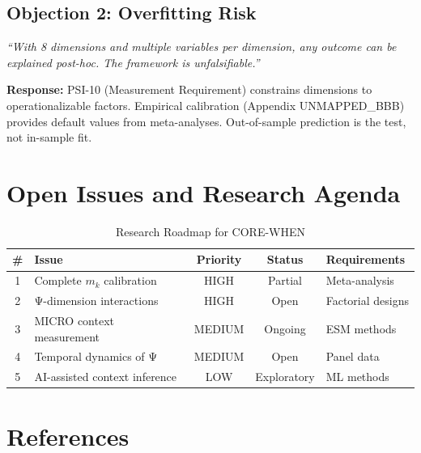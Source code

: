 \subsection{Objection 2: Overfitting Risk}

\begin{tcolorbox}[colback=red!5!white, colframe=red!50!black,
    title=Objection: Too Many Free Parameters]
\textit{``With 8 dimensions and multiple variables per dimension, any outcome
can be explained post-hoc. The framework is unfalsifiable.''}
\end{tcolorbox}

\textbf{Response:}
PSI-10 (Measurement Requirement) constrains dimensions to operationalizable factors.
Empirical calibration (Appendix UNMAPPED_BBB) provides default values from meta-analyses.
Out-of-sample prediction is the test, not in-sample fit.


\section{Open Issues and Research Agenda}
\label{sec:when-open}

\begin{table}[htbp]
\centering
\caption{Research Roadmap for CORE-WHEN}
\label{tab:when-roadmap}
\renewcommand{\arraystretch}{1.3}
\begin{tabular}{@{}clccl@{}}
\toprule
\textbf{\#} & \textbf{Issue} & \textbf{Priority} & \textbf{Status} & \textbf{Requirements} \\
\midrule
1 & Complete $m_k$ calibration & HIGH & Partial & Meta-analysis \\
2 & Ψ-dimension interactions & HIGH & Open & Factorial designs \\
3 & MICRO context measurement & MEDIUM & Ongoing & ESM methods \\
4 & Temporal dynamics of Ψ & MEDIUM & Open & Panel data \\
5 & AI-assisted context inference & LOW & Exploratory & ML methods \\
\bottomrule
\end{tabular}
\end{table}


\section{References}
\label{sec:when-references}

